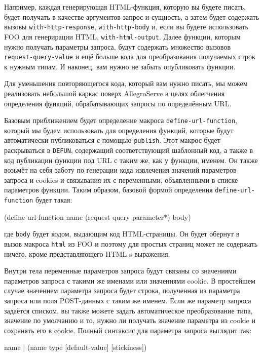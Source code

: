 Например, каждая генерирующая HTML-функция, которую вы будете писать, будет получать в
качестве аргументов запрос и сущность, а затем будет содержать вызовы
\lstinline{with-http-response}, \lstinline{with-http-body} и, если вы будете использовать FOO
для генерирации HTML, \lstinline{with-html-output}. Далее функции, которым нужно получать
параметры запроса, будут содержать множество вызовов \lstinline{request-query-value} и ещё
больше кода для преобразования получаемых строк к нужным типам. И наконец, вам нужно не
забыть опубликовать функции.

Для уменьшения повторяющегося кода, который вам нужно писать, мы можем реализовать
небольшой каркас поверх AllegroServe в целях облегчения определения функций,
обрабатывающих запросы по определённым URL.

Базовым приближением будет определение макроса \lstinline{define-url-function}, который мы будем
использовать для определения функций, которые будут автоматически публиковаться с помощью
\lstinline{publish}. Этот макрос будет раскрываться в \lstinline{DEFUN}, содержащий
соответствующий шаблонный код, а также в код публикации функции под URL с таким же, как у
функции, именем. Он также возьмёт на себя заботу по генерации кода извлечения значений
параметров запроса и cookies и связывания их с переменными, объявленными в списке
параметров функции. Таким образом, базовой формой определения \lstinline{define-url-function}
будет такая:

\begin{myverb}
  (define-url-function name (request query-parameter*)
    body)
\end{myverb}

\noindent{}где \lstinline{body} будет кодом, выдающим код HTML-страницы. Он будет обернут в вызов макроса
\lstinline{html} из FOO и поэтому для простых страниц может не содержать ничего, кроме
представляющего HTML s-выражения.

Внутри тела переменные параметров запроса будут связаны со значениями параметров запроса с
такими же именами или значениями cookie. В простейшем случае значением параметра запроса
будет строка, полученная из параметра запроса или поля POST-данных с таким же именем. Если
же параметр запроса задаётся списком, вы также можете задать автоматическое преобразование
типа, значение по умолчанию и то, нужно ли получать значение параметра из cookie и сохранять его
в cookie. Полный синтаксис для параметра запроса выглядит так:

\begin{myverb}
  name | (name type [default-value] [stickiness])
\end{myverb}

